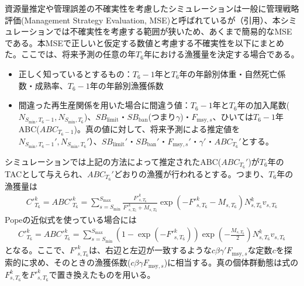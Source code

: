 \documentclass[11pt]{jsarticle}
\begin{document}
資源量推定や管理誤差の不確実性を考慮したシミュレーションは一般に管理戦略評価(Management Strategy Evaluation, MSE)と呼ばれているが（引用）、本シミュレーションでは不確実性を考慮する範囲が狭いため、あくまで簡易的なMSEである。本MSEで正しいと仮定する数値と考慮する不確実性を以下にまとめた。ここでは、将来予測の任意の年$T_6$年における漁獲量を決定する場合である。
\begin{itemize}
\item 正しく知っているとするもの：$T_6-1$年と$T_6$年の年齢別体重・自然死亡係数・成熟率、$T_6-1$年の年齢別漁獲係数
\item 間違った再生産関係を用いた場合に間違う値：$T_6-1$年と$T_6$年の加入尾数($N_{S_{\mathrm{min}},T_6 -1}, N_{S_{\mathrm{min}},T_6}$)、$S\!B_{\mathrm{limit}}$・$S\!B_{\mathrm{ban}}$(つまり$\gamma$)・$F_{\mathrm{msy},s}$、ひいては$T_6-1$年ABC($ABC_{T_6-1}$)。真の値に対して、将来予測による推定値を$N_{S_{\mathrm{min}},T_6-1}', N_{S_{\mathrm{min}},T_6}'$）、$S\!B_{\mathrm{limit}}'$・$S\!B_{\mathrm{ban}}'$・$F_{\mathrm{msy},s}'$・$\gamma'$・$ABC_{T_6}'$とする。
\end{itemize}

シミュレーションでは上記の方法によって推定されたABC($ABC_{T_6}'$)が$T_6$年のTACとして与えられ、$ABC_{T_6}'$どおりの漁獲が行われるとする。つまり、$T_6$年の漁獲量は
\begin{eqnarray}
  {C'}_{T_6}^{k}={ABC'}_{T_6}^{k}=\sum_{s=S_{\mathrm{min}}}^{S_{\mathrm{max}}} \frac{{F'}_{s,T_6}^k}{{F'}_{s,T_6}^k+M_{s,T_6}}
  \exp(- {F'}_{s,T_6}^k - M_{s,T_6}) N_{s,T_6}^k v_{s,T_6}
\label{ABC_MSE_eq1}
\end{eqnarray}
Popeの近似式を使っている場合には
\begin{eqnarray}
  {C'}_{T_6}^k={ABC'}_{T_6}^{k}=\sum_{s=S_{\mathrm{min}}}^{S_{\mathrm{max}}} (1-\exp(- {F'}_{s,T_6}^k)) \exp(-\frac{M_{s,T_6}}{2}) N_{s,T_6}^k v_{s,T_6}
\label{ABC_MSE_eq2}
\end{eqnarray}
となる。ここで、${F'}_{s,T_6}^k$は、右辺と左辺が一致するような$c \beta \gamma' F_{\mathrm{msy},s}$な定数$c$を探索的に求め、そのときの漁獲係数($c \beta \gamma F_{\mathrm{msy},s}$)に相当する。真の個体群動態は式\label{future_eq3}の$F_{s,T_6}^k$を${F'}_{s,T_6}^k$で置き換えたものを用いる。
\end{document}
